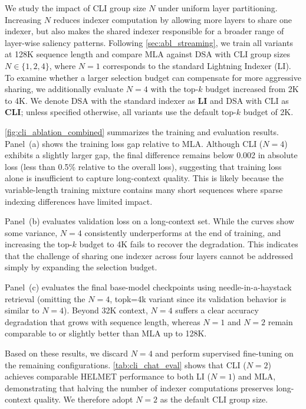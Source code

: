 \documentclass{article}
\begin{document}
We study the impact of CLI group size \(N\) under uniform layer partitioning. Increasing \(N\) reduces indexer computation by allowing more layers to share one indexer, but also makes the shared indexer responsible for a broader range of layer-wise saliency patterns. Following \cref{sec:abl_streaming}, we train all variants at 128K sequence length and compare MLA against DSA with CLI group sizes \(N\in\{1,2,4\}\), where \(N{=}1\) corresponds to the standard Lightning Indexer (LI). To examine whether a larger selection budget can compensate for more aggressive sharing, we additionally evaluate \(N{=}4\) with the top-\(k\) budget increased from 2K to 4K. We denote DSA with the standard indexer as \textbf{LI} and DSA with CLI as \textbf{CLI}; unless specified otherwise, all variants use the default top-\(k\) budget of 2K.

\cref{fig:cli_ablation_combined} summarizes the training and evaluation results. Panel~(a) shows the training loss gap relative to MLA. Although CLI (\(N{=}4\)) exhibits a slightly larger gap, the final difference remains below 0.002 in absolute loss (less than 0.5\% relative to the overall loss), suggesting that training loss alone is insufficient to capture long-context quality. This is likely because the variable-length training mixture contains many short sequences where sparse indexing differences have limited impact.

Panel~(b) evaluates validation loss on a long-context set. While the curves show some variance, \(N{=}4\) consistently underperforms at the end of training, and increasing the top-\(k\) budget to 4K fails to recover the degradation. This indicates that the challenge of sharing one indexer across four layers cannot be addressed simply by expanding the selection budget.

Panel~(c) evaluates the final base-model checkpoints using needle-in-a-haystack retrieval (omitting the \(N{=}4\), topk=4k variant since its validation behavior is similar to \(N{=}4\)). Beyond 32K context, \(N{=}4\) suffers a clear accuracy degradation that grows with sequence length, whereas \(N{=}1\) and \(N{=}2\) remain comparable to or slightly better than MLA up to 128K.

Based on these results, we discard \(N{=}4\) and perform supervised fine-tuning on the remaining configurations. \cref{tab:cli_chat_eval} shows that CLI (\(N{=}2\)) achieves comparable HELMET performance to both LI (\(N{=}1\)) and MLA, demonstrating that halving the number of indexer computations preserves long-context quality. We therefore adopt \(N{=}2\) as the default CLI group size.
\end{document}
